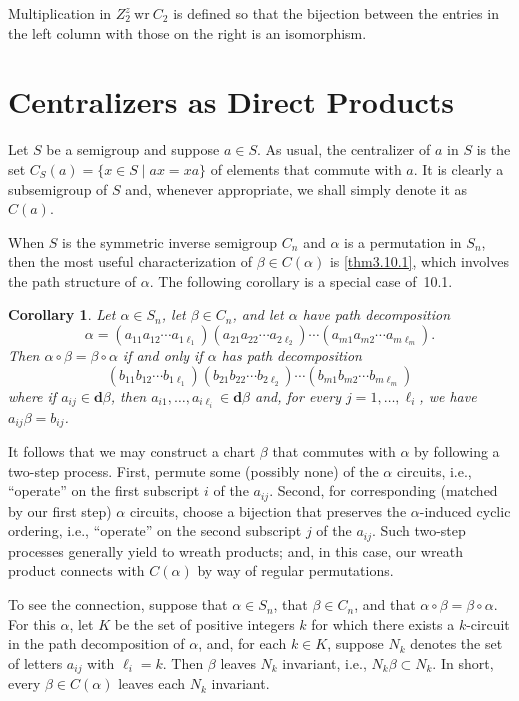\documentclass{surv-l}
\numberwithin{equation}{section}
\numberwithin{table}{section}
\numberwithin{figure}{section}
\newtheorem{corollary}[equation]{Corollary}
\theoremstyle{definition}
\begin{document}
Multiplication in $Z_{2}^{z}\  \mathrm{wr} \ C_{2}$ is defined so
that the bijection between the entries in the left column with
those on the right is an isomorphism.

\section{Centralizers as Direct Products}\label{sec4.13}

Let $S$ be a semigroup and suppose $a\in S$. As usual, the
centralizer of $a$ in $S$ is the set $C_{S}(a)=\{x\in S \mid
ax =xa\}$ of elements that commute with $a$. It is clearly a
subsemigroup of $S$ and, whenever appropriate, we shall simply
denote it as~$C(a)$.

When $S$ is the symmetric inverse semigroup $C_{n}$ and $\alpha$
is a permutation in $S_{n}$, then the most useful characterization
of $\beta\in C(\alpha)$ is \ref{thm3.10.1}, which involves the
path structure of $\alpha$. The following corollary is a special
case of~10.1.

\begin{corollary}\label{cor3.13.1}
Let $\alpha\in S_{n}$, let $\beta\in C_{n}$, and let $\alpha$ have
path decomposition
\[
\alpha=(a_{11}a_{12}\cdots a_{1\ell_{1}})(a_{21}a_{22}\cdots a_{2\ell_{2}})\cdots(a_{m1}a_{m2}\cdots a_{m\ell_{m}}).
\]
Then $\alpha \circ\beta=\beta \circ\alpha$ if and only if $\alpha$
has path decomposition
\[
(b_{11}b_{12}\cdots b_{1\ell_{1}})(b_{21}b_{22}\cdots b_{2\ell_{2}})\cdots(b_{m1}b_{m2}\cdots b_{m\ell_{m}})
\]
where if $a_{ij}\in \mathbf{d}\beta$, then $a_{i1},\ldots,
a_{i\ell_{i}}\in \mathbf{d}\beta$ and, for every $j=1,\ldots,
\ell_{i}$, we have $a_{ij}\beta=b_{ij}$.
\end{corollary}

It follows that we may construct a chart $\beta$ that commutes
with $\alpha$ by following a two-step process. First, permute some
(possibly none) of the $\alpha$ circuits, i.e., ``operate'' on the
first subscript $i$ of the $a_{ij}$. Second, for corresponding
(matched by our first step) $\alpha$ circuits, choose a bijection
that preserves the $\alpha$-induced cyclic ordering, i.e.,
``operate'' on the second subscript $j$ of the $a_{ij}$. Such
two-step processes generally yield to wreath products; and, in
this case, our wreath product connects with $C(\alpha)$ by way of
regular permutations.

To see the connection, suppose that $\alpha\in S_{n}$, that
$\beta\in C_{n}$, and that $\alpha \circ\beta=\beta \circ\alpha$.
For this $\alpha$, let $K$ be the set of positive integers $k$ for
which there exists a $k$-circuit in the path decomposition of
$\alpha$, and, for each $k\in K$, suppose $N_{k}$ denotes the set
of letters $a_{ij}$ with $\ell_{i}=k$. Then $\beta$ leaves $N_{k}$
invariant, i.e., $N_{k}\beta\subset N_{k}$. In short, every
$\beta\in C(\alpha)$ leaves each $N_{k}$ invariant.
\end{document}
